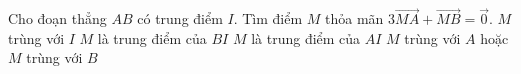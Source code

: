 \begin{ex}%
	Cho đoạn thẳng $AB$ có trung điểm $I$. Tìm điểm $M$ thỏa mãn $3\overrightarrow{MA}+\overrightarrow{MB}=\overrightarrow{0}$.
	\choice
	{$M$ trùng với $I$}
	{$M$ là trung điểm của  $BI$}
	{\True $M$ là trung điểm của  $AI$}
	{$M$ trùng với $A$ hoặc $M$ trùng với $B$}
\end{ex}

